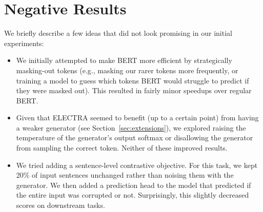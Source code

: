 \documentclass{article}
\begin{document}
\section{Negative Results}
\label{app:neg}

We briefly describe a few ideas that did not look promising in our initial experiments:
\begin{itemize}
    \item We initially attempted to make BERT more efficient by strategically masking-out tokens (e.g., masking our rarer tokens more frequently, or training a model to guess which tokens BERT would struggle to predict if they were masked out). This resulted in fairly minor speedups over regular BERT.  
    \item Given that ELECTRA seemed to benefit (up to a certain point) from having a weaker generator (see Section~\ref{sec:extensions}), we explored raising the temperature of the generator's output softmax or disallowing the generator from sampling the correct token. Neither of these improved results.
    \item We tried adding a sentence-level contrastive objective. For this task, we kept 20\% of input sentences unchanged rather than noising them with the generator. We then added a prediction head to the model that predicted if the entire input was corrupted or not. Surprisingly, this slightly decreased scores on downstream tasks.
\end{itemize}
\end{document}
